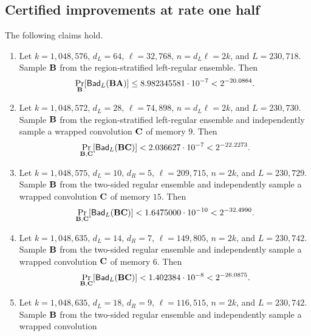 \subsection{Certified improvements at rate one half}

\begin{theorem}
\label{thm:regular-binary-certificates}
The following claims hold.
\begin{enumerate}
  \item Let $k=1{,}048{,}576$, $d_L=64$, $\ell=32{,}768$,
  $n=d_L\ell=2k$, and $L=230{,}718$.  Sample $\mathbf B$ from the
  region-stratified left-regular ensemble.  Then
  \begin{equation}
   \Pr_{\mathbf B}[\mathsf{Bad}_L(\mathbf B\mathbf A)]
   \leq8.982345581\cdot10^{-7}<2^{-20.0864}.
   \label{eq:regular-ea-certificate}
  \end{equation}
  \item Let $k=1{,}048{,}572$, $d_L=28$, $\ell=74{,}898$,
  $n=d_L\ell=2k$, and $L=230{,}730$.  Sample $\mathbf B$ from the
  region-stratified left-regular ensemble and independently sample a wrapped
  convolution $\mathbf C$ of memory $9$.  Then
  \begin{equation}
   \Pr_{\mathbf B,\mathbf C}[\mathsf{Bad}_L(\mathbf B\mathbf C)]
   <2.036627\cdot10^{-7}<2^{-22.2273}.
   \label{eq:regular-ec-certificate}
  \end{equation}
  \item Let $k=1{,}048{,}575$, $d_L=10$, $d_R=5$,
  $\ell=209{,}715$, $n=2k$, and $L=230{,}729$.  Sample $\mathbf B$ from the
  two-sided regular ensemble and independently sample a wrapped convolution
  $\mathbf C$ of memory $15$.  Then
  \begin{equation}
   \Pr_{\mathbf B,\mathbf C}[\mathsf{Bad}_L(\mathbf B\mathbf C)]
   <1.6475000\cdot10^{-10}<2^{-32.4990}.
   \label{eq:biregular-binary-ec-certificate}
  \end{equation}
  \item Let $k=1{,}048{,}635$, $d_L=14$, $d_R=7$,
  $\ell=149{,}805$, $n=2k$, and $L=230{,}742$.  Sample $\mathbf B$ from the
  two-sided regular ensemble and independently sample a wrapped convolution
  $\mathbf C$ of memory $6$.  Then
  \begin{equation}
   \Pr_{\mathbf B,\mathbf C}[\mathsf{Bad}_L(\mathbf B\mathbf C)]
   <1.402384\cdot10^{-8}<2^{-26.0875}.
   \label{eq:biregular-binary-ec-degree-fourteen-certificate}
  \end{equation}
  \item Let $k=1{,}048{,}635$, $d_L=18$, $d_R=9$,
  $\ell=116{,}515$, $n=2k$, and $L=230{,}742$.  Sample $\mathbf B$ from the
  two-sided regular ensemble and independently sample a wrapped convolution

\end{enumerate}
\end{theorem}
